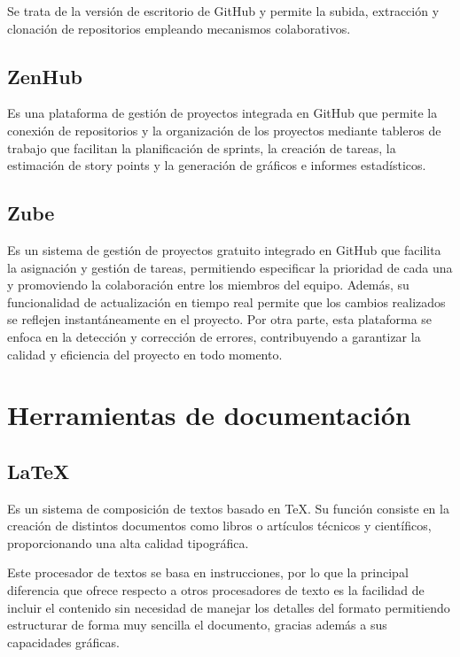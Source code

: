 Se trata de la versión de escritorio de GitHub y permite la subida, extracción y clonación de repositorios empleando mecanismos colaborativos.

\subsection{ZenHub}
\cite{ZenHub_bib} Es una plataforma de gestión de proyectos integrada en GitHub que permite la conexión de repositorios y la organización de los proyectos mediante tableros de trabajo que facilitan la planificación de sprints, la creación de tareas, la estimación de story points y la generación de gráficos e informes estadísticos.

\subsection{Zube}
\cite{Zube_bib} Es un sistema de gestión de proyectos gratuito integrado en GitHub que facilita la asignación y gestión de tareas, permitiendo especificar la prioridad de cada una y promoviendo la colaboración entre los miembros del equipo. Además, su funcionalidad de actualización en tiempo real permite que los cambios realizados se reflejen instantáneamente en el proyecto. Por otra parte, esta plataforma se enfoca en la detección y corrección de errores, contribuyendo a garantizar la calidad y eficiencia del proyecto en todo momento.

\section{Herramientas de documentación}
\subsection{LaTeX}
\cite{LaTeX_bib} Es un sistema de composición de textos basado en TeX. Su función consiste en la creación
de distintos documentos como libros o artículos técnicos y científicos, proporcionando una alta calidad tipográfica. 

Este procesador de textos se basa en instrucciones, por lo que la principal diferencia que ofrece respecto a otros procesadores de texto es la facilidad de incluir el contenido sin necesidad de manejar los detalles del formato permitiendo estructurar de forma muy sencilla el documento, gracias además a sus capacidades gráficas.

